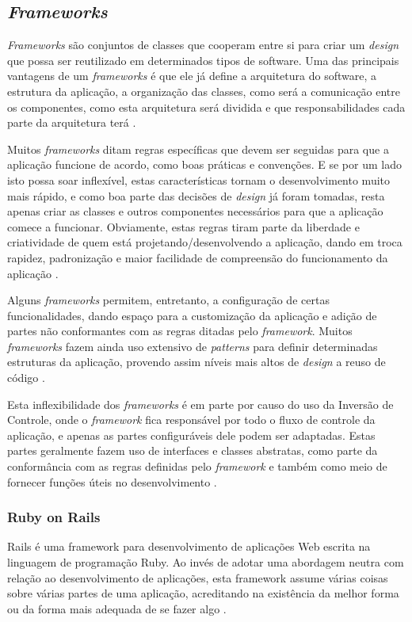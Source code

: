 \documentclass[diss]{template/setrem}
\begin{document}
\subsection{\textit{Frameworks}}
\emph{Frameworks} são conjuntos de classes que cooperam entre si para criar um \emph{design} que possa ser reutilizado em determinados tipos de software. Uma das principais vantagens de um \emph{frameworks} é que ele já define a arquitetura do software, a estrutura da aplicação, a organização das classes, como será a comunicação entre os componentes, como esta arquitetura será dividida e que responsabilidades cada parte da arquitetura terá \citep{Gamma1998}.

Muitos \emph{frameworks} ditam regras específicas que devem ser seguidas para que a aplicação funcione de acordo, como boas práticas e convenções. E se por um lado isto possa soar inflexível, estas características tornam o desenvolvimento muito mais rápido, e como boa parte das decisões de \emph{design} já foram tomadas, resta apenas criar as classes e outros componentes necessários para que a aplicação comece a funcionar. Obviamente, estas regras tiram parte da liberdade e criatividade de quem está projetando/desenvolvendo a aplicação, dando em troca rapidez, padronização e maior facilidade de compreensão do funcionamento da aplicação \citep{Gamma1998}.

Alguns \emph{frameworks} permitem, entretanto, a configuração de certas funcionalidades, dando espaço para a customização da aplicação e adição de partes não conformantes com as regras ditadas pelo \emph{framework}. Muitos \emph{frameworks} fazem ainda uso extensivo de \emph{patterns} para definir determinadas estruturas da aplicação, provendo assim níveis mais altos de \emph{design} a reuso de código \citep{Gamma1998}.

Esta inflexibilidade dos \emph{frameworks} é em parte por causo do uso da Inversão de Controle, onde o \emph{framework} fica responsável por todo o fluxo de controle da aplicação, e apenas as partes configuráveis dele podem ser adaptadas. Estas partes geralmente fazem uso de interfaces e classes abstratas, como parte da conformância com as regras definidas pelo \emph{framework} e também como meio de fornecer funções úteis no desenvolvimento \citep{Vogel2011}.

\subsubsection{Ruby on Rails}
Rails é uma framework para desenvolvimento de aplicações Web escrita na linguagem de programação Ruby. Ao invés de adotar uma abordagem neutra com relação ao desenvolvimento de aplicações, esta framework assume várias coisas sobre várias partes de uma aplicação, acreditando na existência da melhor forma ou da forma mais adequada de se fazer algo \citep{Ruby2009}.
\end{document}
